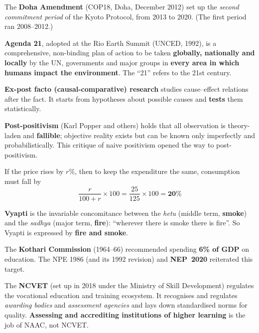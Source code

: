 The \textbf{Doha Amendment} (COP18, Doha, December 2012) set up the \emph{second commitment period} of the Kyoto Protocol, from 2013 to 2020. (The first period ran 2008--2012.)

\textbf{Agenda 21}, adopted at the Rio Earth Summit (UNCED, 1992), is a comprehensive, non-binding plan of action to be taken \textbf{globally, nationally and locally} by the UN, governments and major groups in \textbf{every area in which humans impact the environment}. The ``21'' refers to the 21st century.

\textbf{Ex-post facto (causal-comparative) research} studies cause--effect relations after the fact. It starts from hypotheses about possible causes and \textbf{tests} them statistically.

\textbf{Post-positivism} (Karl Popper and others) holds that all observation is theory-laden and \textbf{fallible}; objective reality exists but can be known only imperfectly and probabilistically. This critique of naive positivism opened the way to post-positivism.

If the price rises by $r\%$, then to keep the expenditure the same, consumption must fall by
\[\frac{r}{100+r}\times100=\frac{25}{125}\times100=\mathbf{20\%}\]

\textbf{Vyapti} is the invariable concomitance between the \emph{hetu} (middle term, \textbf{smoke}) and the \emph{sadhya} (major term, \textbf{fire}): ``wherever there is smoke there is fire''. So Vyapti is expressed by \textbf{fire and smoke}.

The \textbf{Kothari Commission} (1964--66) recommended spending \textbf{6\% of GDP} on education. The NPE 1986 (and its 1992 revision) and \textbf{NEP~2020} reiterated this target.

The \textbf{NCVET} (set up in 2018 under the Ministry of Skill Development) regulates the vocational education and training ecosystem. It recognises and regulates \emph{awarding bodies} and \emph{assessment agencies} and lays down standardised norms for quality. \textbf{Assessing and accrediting institutions of higher learning} is the job of NAAC, not NCVET.

